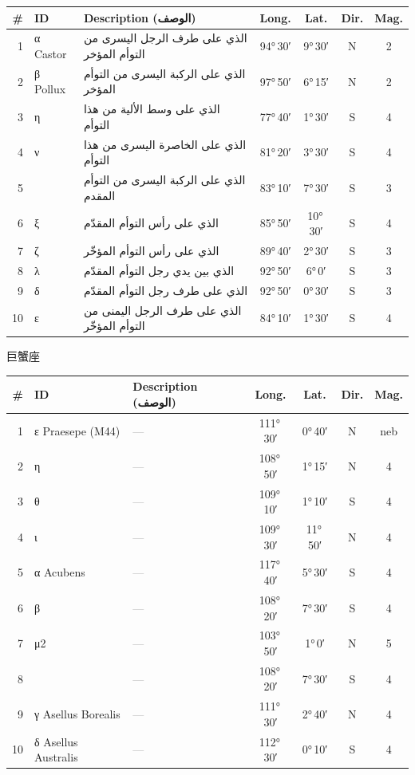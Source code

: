 \documentclass[9pt,a4paper]{extarticle}
\newcommand{\ar}[1]{{\arabicfont\textarabic{#1}}}
\begin{document}
\begin{longtable}{r l >{\raggedright\arraybackslash}p{6.7cm} c c c c}
\toprule \# & ID & Description (\ar{الوصف}) & Long. & Lat. & Dir. & Mag.\\ \midrule\endhead
1 & α Castor & \ar{الذي على طرف الرجل اليسرى من التوأم المؤخر} & 94°\,30′ & 9°\,30′ & N & 2\\
2 & β Pollux & \ar{الذي على الركبة اليسرى من التوأم المؤخر} & 97°\,50′ & 6°\,15′ & N & 2\\
3 & η & \ar{الذي على وسط الألية من هذا التوأم} & 77°\,40′ & 1°\,30′ & S & 4\\
4 & ν & \ar{الذي على الخاصرة اليسرى من هذا التوأم} & 81°\,20′ & 3°\,30′ & S & 4\\
5 &  & \ar{الذي على الركبة اليسرى من التوأم المقدم} & 83°\,10′ & 7°\,30′ & S & 3\\
6 & ξ & \ar{الذي على رأس التوأم المقدّم} & 85°\,50′ & 10°\,30′ & S & 4\\
7 & ζ & \ar{الذي على رأس التوأم المؤخّر} & 89°\,40′ & 2°\,30′ & S & 3\\
8 & λ & \ar{الذي بين يدي رجل التوأم المقدّم} & 92°\,50′ & 6°\,0′ & S & 3\\
9 & δ & \ar{الذي على طرف رجل التوأم المقدّم} & 92°\,50′ & 0°\,30′ & S & 3\\
10 & ε & \ar{الذي على طرف الرجل اليمنى من التوأم المؤخّر} & 84°\,10′ & 1°\,30′ & S & 4\\
\bottomrule\end{longtable}
\vspace{4pt}\quad\ar{السرطان}\quad 巨蟹座
\begin{longtable}{r l >{\raggedright\arraybackslash}p{6.7cm} c c c c}
\toprule \# & ID & Description (\ar{الوصف}) & Long. & Lat. & Dir. & Mag.\\ \midrule\endhead
1 & ε Praesepe (M44) & \textcolor{gray}{—} & 111°\,30′ & 0°\,40′ & N & neb\\
2 & η & \textcolor{gray}{—} & 108°\,50′ & 1°\,15′ & N & 4\\
3 & θ & \textcolor{gray}{—} & 109°\,10′ & 1°\,10′ & S & 4\\
4 & ι & \textcolor{gray}{—} & 109°\,30′ & 11°\,50′ & N & 4\\
5 & α Acubens & \textcolor{gray}{—} & 117°\,40′ & 5°\,30′ & S & 4\\
6 & β & \textcolor{gray}{—} & 108°\,20′ & 7°\,30′ & S & 4\\
7 & μ2 & \textcolor{gray}{—} & 103°\,50′ & 1°\,0′ & N & 5\\
8 &  & \textcolor{gray}{—} & 108°\,20′ & 7°\,30′ & S & 4\\
9 & γ Asellus Borealis & \textcolor{gray}{—} & 111°\,30′ & 2°\,40′ & N & 4\\
10 & δ Asellus Australis & \textcolor{gray}{—} & 112°\,30′ & 0°\,10′ & S & 4\\
\bottomrule\end{longtable}
\end{document}
